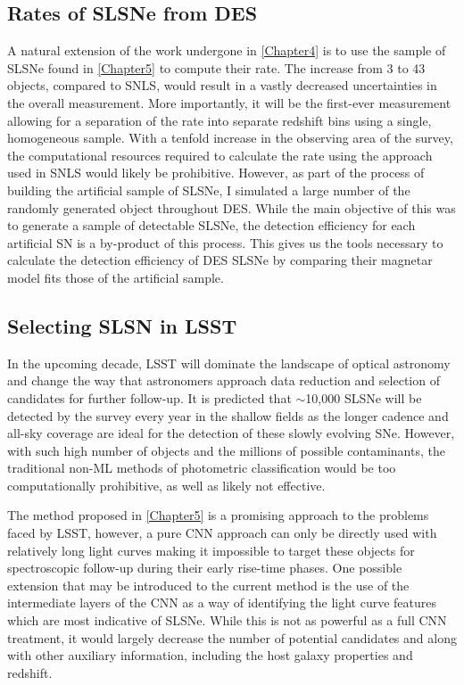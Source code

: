\subsection{Rates of SLSNe from DES}
A natural extension of the work undergone in \cref{Chapter4} is to use the sample of SLSNe found in \cref{Chapter5} to compute their rate. The increase from 3 to 43 objects, compared to SNLS, would result in a vastly decreased uncertainties in the overall measurement. More importantly, it will be the first-ever measurement allowing for a separation of the rate into separate redshift bins using a single, homogeneous sample. With a tenfold increase in the observing area of the survey, the computational resources required to calculate the rate using the approach used in SNLS would likely be prohibitive. However, as part of the process of building the artificial sample of SLSNe, I simulated a large number of the randomly generated object throughout DES. While the main objective of this was to generate a sample of detectable SLSNe, the detection efficiency for each artificial SN is a by-product of this process. This gives us the tools necessary to calculate the detection efficiency of DES SLSNe by comparing their magnetar model fits those of the artificial sample.

\subsection{Selecting SLSN in LSST}
In the upcoming decade, LSST will dominate the landscape of optical astronomy and change the way that astronomers approach data reduction and selection of candidates for further follow-up. It is predicted that $\sim$10,000 SLSNe will be detected by the survey every year in the shallow fields as the longer cadence and all-sky coverage are ideal for the detection of these slowly evolving SNe. However, with such high number of objects and the millions of possible contaminants, the traditional non-ML methods of photometric classification would be too computationally prohibitive, as well as likely not effective.

The method proposed in \cref{Chapter5} is a promising approach to the problems faced by LSST, however, a pure CNN approach can only be directly used with relatively long light curves making it impossible to target these objects for spectroscopic follow-up during their early rise-time phases. One possible extension that may be introduced to the current method is the use of the intermediate layers of the CNN as a way of identifying the light curve features which are most indicative of SLSNe. While this is not as powerful as a full CNN treatment, it would largely decrease the number of potential candidates and along with other auxiliary information, including the host galaxy properties and redshift.

